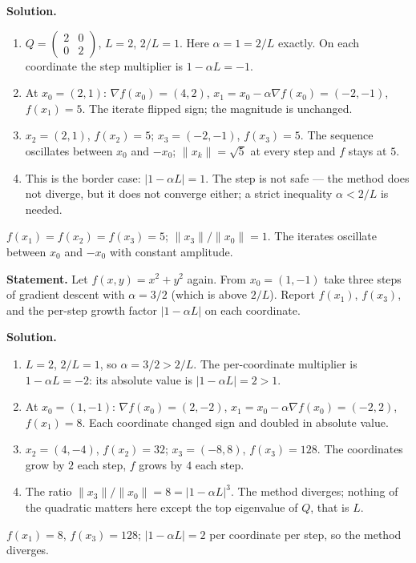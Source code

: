 \documentclass[11pt,a4paper]{article}
\newcommand{\problemhead}[3]{\par\bigskip\noindent{\color{hseblue}\large\bfseries #1.\ #2}\par\nopagebreak
  \noindent{\small\itshape\color{hsegray}#3}\par\nopagebreak\smallskip}
\begin{document}
\textbf{Solution.}
\begingroup\sloppy
\begin{enumerate}[label=\textbf{\arabic*.}, leftmargin=*]
  \item $Q=\begin{pmatrix}2&0\\0&2\end{pmatrix}$, $L=2$, $2/L=1$. Here $\alpha=1=2/L$ exactly. On each coordinate the step multiplier is $1-\alpha L=-1$.
  \item At $x_0=(2,1)$: $\nabla f(x_0)=(4,2)$, $x_1=x_0-\alpha\nabla f(x_0)=(-2,-1)$, $f(x_1)=5$. The iterate flipped sign; the magnitude is unchanged.
  \item $x_2=(2,1)$, $f(x_2)=5$; $x_3=(-2,-1)$, $f(x_3)=5$. The sequence oscillates between $x_0$ and $-x_0$; $\|x_k\|=\sqrt 5$ at every step and $f$ stays at $5$.
  \item This is the border case: $|1-\alpha L|=1$. The step is not safe --- the method does not diverge, but it does not converge either; a strict inequality $\alpha<2/L$ is needed.
\end{enumerate}
\endgroup
\begin{answerbox}
$f(x_1)=f(x_2)=f(x_3)=5$; $\|x_3\|/\|x_0\|=1$. The iterates oscillate between $x_0$ and $-x_0$ with constant amplitude.
\end{answerbox}

\problemhead{B4}{Three steps when $\alpha>2/L$}{On your own}
\textbf{Statement.} Let $f(x,y)=x^2+y^2$ again. From $x_0=(1,-1)$ take three steps of gradient descent with $\alpha=3/2$ (which is above $2/L$). Report $f(x_1)$, $f(x_3)$, and the per-step growth factor $|1-\alpha L|$ on each coordinate.

\textbf{Solution.}
\begingroup\sloppy
\begin{enumerate}[label=\textbf{\arabic*.}, leftmargin=*]
  \item $L=2$, $2/L=1$, so $\alpha=3/2>2/L$. The per-coordinate multiplier is $1-\alpha L=-2$: its absolute value is $|1-\alpha L|=2>1$.
  \item At $x_0=(1,-1)$: $\nabla f(x_0)=(2,-2)$, $x_1=x_0-\alpha\nabla f(x_0)=(-2,2)$, $f(x_1)=8$. Each coordinate changed sign and doubled in absolute value.
  \item $x_2=(4,-4)$, $f(x_2)=32$; $x_3=(-8,8)$, $f(x_3)=128$. The coordinates grow by $2$ each step, $f$ grows by $4$ each step.
  \item The ratio $\|x_3\|/\|x_0\|=8=|1-\alpha L|^3$. The method diverges; nothing of the quadratic matters here except the top eigenvalue of $Q$, that is $L$.
\end{enumerate}
\endgroup
\begin{answerbox}
$f(x_1)=8$, $f(x_3)=128$; $|1-\alpha L|=2$ per coordinate per step, so the method diverges.
\end{answerbox}
\end{document}
